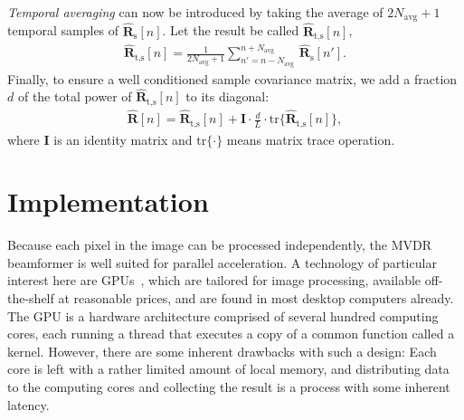 \documentclass[10pt,a4paper]{article}
\newcommand\tr{\text{tr}}
\newcommand\sumb[2]{\sum\limits_{#1}^{#2}\,}
\newcommand\mat[1]{\boldsymbol{#1}}
\newcommand\1{\vec 1}
\newcommand\I{\mat I}
\newcommand*\eR{\mat{\hat R}}
\begin{document}
\emph{Temporal averaging} can now be introduced by taking the average of $2N_\text{avg}+1$ temporal samples of $\eR_\text{s}[n]$. Let the result be called $\eR_\text{t,s}[n]$,
\begin{gather}
\eR_\text{t,s}[n] = \frac{1}{2N_\text{avg}+1} \sumb{n'=n-N_\text{avg}}{n+N_\text{avg}} \eR_\text{s}[n'].
\end{gather}
Finally, to ensure a well conditioned sample covariance matrix, we add a fraction $d$ of the total power of $\eR_\text{t,s}[n]$ to its diagonal\cite{Synnevag2007}:
\begin{align}
\eR[n] = \eR_\text{t,s}[n] + \I \cdot \frac{d}{L} \cdot \tr\{\eR_\text{t,s}[n]\},\label{finalR}
\end{align}
where $\I$ is an identity matrix and $\tr\{\cdot\}$ means matrix trace operation.


\newpage
\section{Implementation}

Because each pixel in the image can be processed independently, the \gls{MVDR} beamformer is well suited for parallel acceleration. A technology of particular interest here are \glspl{GPU}~\cite{Nilsen2009}, which are tailored for image processing, available off-the-shelf at reasonable prices, and are found in most desktop computers already. The \gls{GPU} is a hardware architecture comprised of several hundred computing cores, each running a thread that executes a copy of a common function called a kernel.  However, there are some inherent drawbacks with such a design: Each core is left with a rather limited amount of local memory, and distributing data to the computing cores and collecting the result is a process with some inherent latency.
\end{document}

